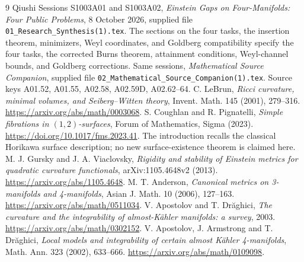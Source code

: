 \documentclass[11pt,a4paper]{article}
\numberwithin{equation}{section}
\theoremstyle{definition}\newtheorem{hypothesis}[theorem]{Input}
\theoremstyle{remark}\newtheorem{remark}[theorem]{Remark}
\begin{document}
\begin{thebibliography}{9}
Qiushi Sessions S1003A01 and S1003A02,
\emph{Einstein Gaps on Four-Manifolds: Four Public Problems},
8 October 2026, supplied file \texttt{01\_Research\_Synthesis(1).tex}.
The sections on the four tasks, the insertion theorem, minimizers,
Weyl coordinates, and Goldberg compatibility specify the four tasks, the corrected Burns theorem,
attainment conditions, Weyl-channel bounds, and Goldberg corrections.
Same sessions, \emph{Mathematical Source Companion}, supplied file
\texttt{02\_Mathematical\_Source\_Companion(1).tex}.
Source keys A01.52, A01.55, A02.58, A02.59D, A02.62--64.
C. LeBrun, \emph{Ricci curvature, minimal volumes, and Seiberg--Witten theory},
Invent. Math. 145 (2001), 279--316.
\url{https://arxiv.org/abs/math/0003068}.
S. Coughlan and R. Pignatelli,
\emph{Simple fibrations in $(1,2)$-surfaces},
Forum of Mathematics, Sigma (2023).
\url{https://doi.org/10.1017/fms.2023.41}.
The introduction recalls the classical Horikawa surface description;
no new surface-existence theorem is claimed here.
M. J. Gursky and J. A. Viaclovsky,
\emph{Rigidity and stability of Einstein metrics for quadratic curvature
functionals}, arXiv:1105.4648v2 (2013).
\url{https://arxiv.org/abs/1105.4648}.
M. T. Anderson, \emph{Canonical metrics on 3-manifolds and 4-manifolds},
Asian J. Math. 10 (2006), 127--163.
\url{https://arxiv.org/abs/math/0511034}.
V. Apostolov and T. Dr\u aghici,
\emph{The curvature and the integrability of almost-K\"ahler manifolds:
a survey}, 2003.
\url{https://arxiv.org/abs/math/0302152}.
V. Apostolov, J. Armstrong and T. Dr\u aghici,
\emph{Local models and integrability of certain almost K\"ahler 4-manifolds},
Math. Ann. 323 (2002), 633--666.
\url{https://arxiv.org/abs/math/0109098}.
\end{thebibliography}
\end{document}
